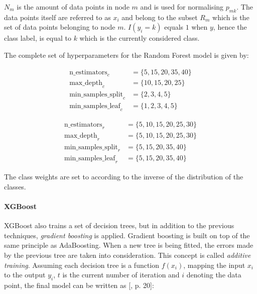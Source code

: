 \documentclass[11pt]{scrartcl}
\begin{document}
$N_m$ is the amount of data points in node $m$ and is used for normalising $p_{mk}$. The data points itself are referred to as $x_i$ and belong to the subset $R_m$ which is the set of data points belonging to node $m$. $I(y_i = k)$ equals $1$ when $y$, hence the class label, is equal to $k$ which is the currently considered class.

The complete set of hyperparameters for the Random Forest model is given by:

\begin{equation}
	\begin{split}
		\text{n\_estimators}_c & = \{5, 15, 20, 35, 40\} \\
		\text{max\_depth}_c & = \{10, 15, 20, 25\} \\
		\text{min\_samples\_split}_c & = \{2, 3, 4, 5\} \\
		\text{min\_samples\_leaf}_c & = \{1, 2, 3, 4, 5\}
	\end{split}
\end{equation}

\begin{equation}
	\begin{split}
		\text{n\_estimators}_r & = \{5, 10, 15, 20, 25, 30\} \\
		\text{max\_depth}_r & = \{5, 10, 15, 20, 25, 30\} \\
		\text{min\_samples\_split}_r & = \{5, 15, 20, 35, 40\} \\
		\text{min\_samples\_leaf}_r & = \{5, 15, 20, 35, 40\}
	\end{split}
\end{equation}

The class weights are set to according to the inverse of the distribution of the classes.

\paragraph{XGBoost} XGBoost also trains a set of decision trees, but in addition to the previous techniques, \textit{gradient boosting} is applied. Gradient boosting is built on top of the same principle as AdaBoosting. When a new tree is being fitted, the errors made by the previous tree are taken into consideration. This concept is called \textit{additive training}. Assuming each decision tree is a function $f(x_i)$, mapping the input $x_i$ to the output $y_i$, $t$ is the current number of iteration and $i$ denoting the data point, the final model can be written as [\cite{xgboost}, p. 20]:
\end{document}
